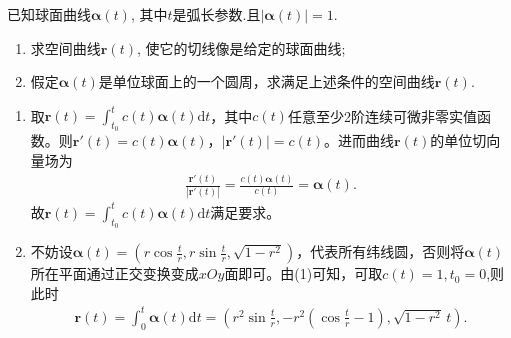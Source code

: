 \documentclass[../../main.tex]{subfiles}%
\begin{document}
\begin{example}
已知球面曲线$\bm{\alpha}(t)$, 其中$t$是弧长参数.且$|\bm{\alpha}(t)|=1$.
\begin{enumerate}[(1)]
\item 求空间曲线$\bm{r}(t)$, 使它的切线像是给定的球面曲线;
\item 假定$\bm{\alpha}(t)$是单位球面上的一个圆周，求满足上述条件的空间曲线$\bm{r}(t)$.
\end{enumerate}
\end{example}
\begin{solution}
\begin{enumerate}[(1)]
\item 取$\bm{r}(t) = \int_{t_0}^t c(t)\bm{\alpha}(t)\mathrm{d}t$，其中$c(t)$任意至少2阶连续可微非零实值函数。则$\bm{r}'(t) = c(t)\bm{\alpha}(t)$，$\left| \bm{r}'(t) \right| = c(t)$。进而曲线$\bm{r}(t)$的单位切向量场为
\begin{align*}
\frac{\bm{r}'(t)}{\left| \bm{r}'(t) \right|} = \frac{c(t)\bm{\alpha}(t)}{c(t)} = \bm{\alpha}(t).
\end{align*}
故$\bm{r}(t) = \int_{t_0}^t c(t)\bm{\alpha}(t)\mathrm{d}t$满足要求。

\item 不妨设$\bm{\alpha}(t) = \left( r\cos \frac{t}{r}, r\sin \frac{t}{r}, \sqrt{1-r^2} \right)$，代表所有纬线圆，否则将$\bm{\alpha}(t)$所在平面通过正交变换变成$xOy$面即可。由(1)可知，可取$c(t)=1,t_0=0$,则此时
\begin{align*}
\bm{r}(t) = \int_0^t \bm{\alpha}(t)\mathrm{d}t = \left( r^2\sin \frac{t}{r}, -r^2\left( \cos \frac{t}{r}-1 \right), \sqrt{1-r^2}\,t \right).
\end{align*}
\end{enumerate}

\end{solution}
\end{document}
